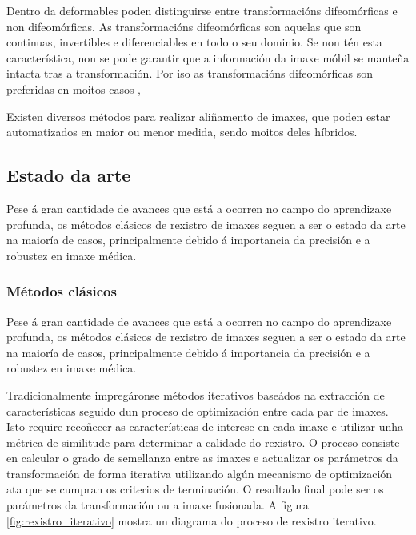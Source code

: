 Dentro da deformables poden distinguirse entre transformacións difeomórficas e non difeomórficas.
As transformacións difeomórficas son aquelas que son continuas, invertibles e diferenciables en todo o seu dominio.
Se non tén esta característica, non se pode garantir que a información da imaxe móbil se manteña intacta tras a transformación.
Por iso as transformacións difeomórficas son preferidas en moitos casos \cite{han2022diffeomorphicimageregistrationneural}, 

Existen diversos métodos para realizar aliñamento de imaxes, que poden estar automatizados en maior ou menor medida, sendo moitos deles híbridos. \cite{deeplernreview3dreg}


\subsection{Estado da arte}
\label{subsec:Estado da arte}

Pese á gran cantidade de avances que está a ocorren no campo do aprendizaxe profunda, os métodos clásicos de rexistro de imaxes seguen a ser o estado da arte na maioría de casos, 
principalmente debido á importancia da precisión e a robustez en imaxe médica.


\subsubsection{Métodos clásicos}
\label{subsubsec:Métodos clásicos}

Pese á gran cantidade de avances que está a ocorren no campo do aprendizaxe profunda, os métodos clásicos de rexistro de imaxes seguen a ser o estado da arte na maioría de casos, 
principalmente debido á importancia da precisión e a robustez en imaxe médica. \cite{}

Tradicionalmente impregáronse métodos iterativos baseádos na extracción de características 
seguido dun proceso de optimización entre cada par de imaxes. 
Isto require recoñecer as características de interese en cada imaxe e utilizar unha métrica de similitude 
para determinar a calidade do rexistro.
O proceso consiste en calcular o grado de semellanza entre as imaxes e 
actualizar os parámetros da transformación de forma iterativa utilizando algún mecanismo de optimización
 ata que se cumpran os criterios de terminación.
O resultado final pode ser os parámetros da transformación ou a imaxe fusionada.
A figura \ref{fig:rexistro_iterativo} mostra un diagrama do proceso de rexistro iterativo.

